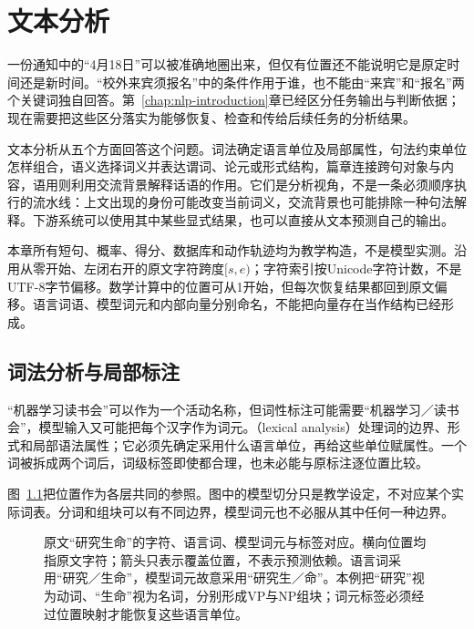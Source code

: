 \chapter{文本分析}
\label{chap:nlp-text-analysis}

一份通知中的“4月18日”可以被准确地圈出来，但仅有位置还不能说明它是原定时间还是新时间。“校外来宾须报名”中的条件作用于谁，也不能由“来宾”和“报名”两个关键词独自回答。第~\ref{chap:nlp-introduction}章已经区分任务输出与判断依据；现在需要把这些区分落实为能够恢复、检查和传给后续任务的分析结果。

文本分析从五个方面回答这个问题。词法确定语言单位及局部属性，句法约束单位怎样组合，语义选择词义并表达谓词、论元或形式结构，篇章连接跨句对象与内容，语用则利用交流背景解释话语的作用。它们是分析视角，不是一条必须顺序执行的流水线：上文出现的身份可能改变当前词义，交流背景也可能排除一种句法解释。下游系统可以使用其中某些显式结果，也可以直接从文本预测自己的输出。

本章所有短句、概率、得分、数据库和动作轨迹均为教学构造，不是模型实测。沿用从零开始、左闭右开的原文字符跨度$[s,e)$；字符索引按Unicode字符计数，不是UTF-8字节偏移。数学计算中的位置可从1开始，但每次恢复结果都回到原文偏移。语言词语、模型词元和内部向量分别命名，不能把向量存在当作结构已经形成。

\section{词法分析与局部标注}
\label{sec:nlp-analysis-lexical}

“机器学习读书会”可以作为一个活动名称，但词性标注可能需要“机器学习／读书会”，模型输入又可能把每个汉字作为词元。（lexical analysis）处理词的边界、形式和局部语法属性；它必须先确定采用什么语言单位，再给这些单位赋属性。一个词被拆成两个词后，词级标签即使都合理，也未必能与原标注逐位置比较。

图~\ref{fig:nlp-analysis-alignment}把位置作为各层共同的参照。图中的模型切分只是教学设定，不对应某个实际词表。分词和组块可以有不同边界，模型词元也不必服从其中任何一种边界。

\begin{figure}[htbp]
  \centering
  
  \caption{原文“研究生命”的字符、语言词、模型词元与标签对应。横向位置均指原文字符；箭头只表示覆盖位置，不表示预测依赖。语言词采用“研究／生命”，模型词元故意采用“研究生／命”。本例把“研究”视为动词、“生命”视为名词，分别形成VP与NP组块；词元标签必须经过位置映射才能恢复这些语言单位。}
  \label{fig:nlp-analysis-alignment}
\end{figure}

